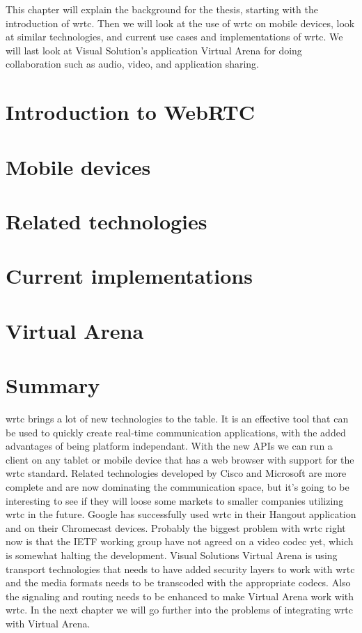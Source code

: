 
This chapter will explain the background for the thesis, starting with the introduction of \gls{wrtc}. Then we will look at the use of \gls{wrtc} on mobile devices, look at similar technologies, and current use cases and implementations of \gls{wrtc}. We will last look at Visual Solution's application Virtual Arena for doing collaboration such as audio, video, and application sharing.

\section{Introduction to WebRTC}


\newpage
\section{Mobile devices}


\newpage
\section{Related technologies}


\newpage
\section{Current implementations}


\newpage
\section{Virtual Arena}
%

\newpage
\section{Summary}
\gls{wrtc} brings a lot of new technologies to the table. It is an effective tool that can be used to quickly create real-time communication applications, with the added advantages of being platform independant. With the new APIs we can run a client on any tablet or mobile device that has a web browser with support for the \gls{wrtc} standard. Related technologies developed by Cisco and Microsoft are more complete and are now dominating the communication space, but it's going to be interesting to see if they will loose some markets to smaller companies utilizing \gls{wrtc} in the future. Google has successfully used \gls{wrtc} in their Hangout application and on their Chromecast devices. Probably the biggest problem with \gls{wrtc} right now is that the IETF working group have not agreed on a video codec yet, which is somewhat halting the development. Visual Solutions Virtual Arena is using transport technologies that needs to have added security layers to work with \gls{wrtc} and the media formats needs to be transcoded with the appropriate codecs. Also the signaling and routing needs to be enhanced to make Virtual Arena work with \gls{wrtc}. In the next chapter we will go further into the problems of integrating \gls{wrtc} with Virtual Arena.